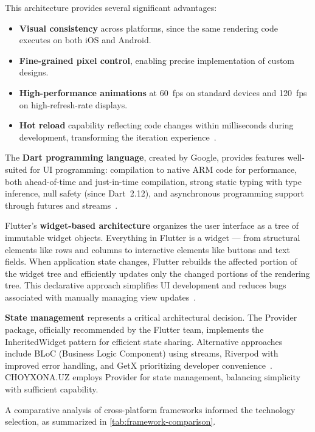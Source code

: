 This architecture provides several significant advantages:
\begin{itemize}
  \item \textbf{Visual consistency} across platforms, since the same rendering code executes on both iOS and Android.
  \item \textbf{Fine-grained pixel control}, enabling precise implementation of custom designs.
  \item \textbf{High-performance animations} at 60~fps on standard devices and 120~fps on high-refresh-rate displays.
  \item \textbf{Hot reload} capability reflecting code changes within milliseconds during development, transforming the iteration experience~\cite{napoli2021}.
\end{itemize}

The \textbf{Dart programming language}, created by Google, provides features well-suited for UI programming: compilation to native ARM code for performance, both ahead-of-time and just-in-time compilation, strong static typing with type inference, null safety (since Dart~2.12), and asynchronous programming support through futures and streams~\cite{dart2024}.

Flutter's \textbf{widget-based architecture} organizes the user interface as a tree of immutable widget objects.
Everything in Flutter is a widget --- from structural elements like rows and columns to interactive elements like buttons and text fields.
When application state changes, Flutter rebuilds the affected portion of the widget tree and efficiently updates only the changed portions of the rendering tree.
This declarative approach simplifies UI development and reduces bugs associated with manually managing view updates~\cite{payne2019}.

\textbf{State management} represents a critical architectural decision.
The Provider package, officially recommended by the Flutter team, implements the InheritedWidget pattern for efficient state sharing.
Alternative approaches include BLoC (Business Logic Component) using streams, Riverpod with improved error handling, and GetX prioritizing developer convenience~\cite{flutter_state2024}.
CHOYXONA.UZ employs Provider for state management, balancing simplicity with sufficient capability.

A comparative analysis of cross-platform frameworks informed the technology selection, as summarized in \cref{tab:framework-comparison}.


